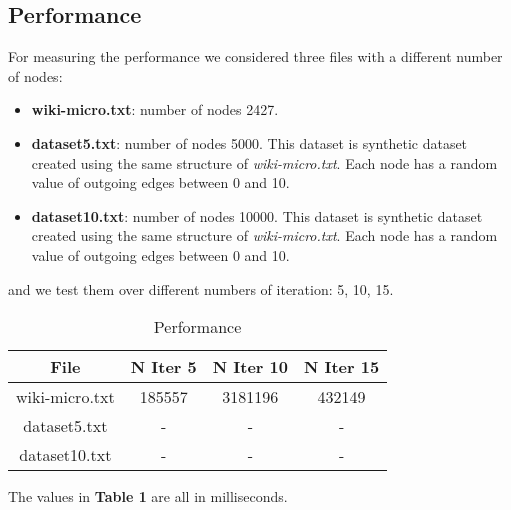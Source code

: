 \subsection{Performance}
For measuring the performance we considered three files with a different number of nodes:
\begin{itemize}
	\item \textbf{wiki-micro.txt}: number of nodes 2427.
	\item \textbf{dataset5.txt}: number of nodes 5000. This dataset is synthetic dataset created using the same structure of \textit{wiki-micro.txt}. Each node has a random value of outgoing edges between 0 and 10.
	\item \textbf{dataset10.txt}: number of nodes 10000. This dataset is synthetic dataset created using the same structure of \textit{wiki-micro.txt}. Each node has a random value of outgoing edges between 0 and 10.
\end{itemize}
and we test them over different numbers of iteration: 5, 10, 15.

\begin{table}[H]
\caption{Performance}
\centering
\begin{tabular}{c c c c}
\hline\hline
File & N Iter 5 & N Iter 10 & N Iter 15 \\ [0.7ex] %
\hline
wiki-micro.txt&185557&3181196&432149 \\
dataset5.txt&-&-&- \\
dataset10.txt& - & - & - \\ [1ex]
\hline
\end{tabular}
\label{table:nonlin}
\end{table}

The values in \textbf{Table 1} are all in milliseconds.